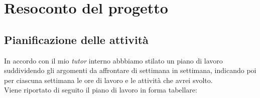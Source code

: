 
\chapter{Resoconto del progetto}
\label{cap:resoconto-progetto}


\section{Pianificazione delle attività}
In accordo con il mio \emph{tutor} interno abbbiamo stilato un piano di lavoro suddividendo gli argomenti da affrontare di settimana in settimana, indicando poi per ciascuna settimana
le ore di lavoro e le attività che avrei svolto. \\
Viene riportato di seguito il piano di lavoro in forma tabellare:

